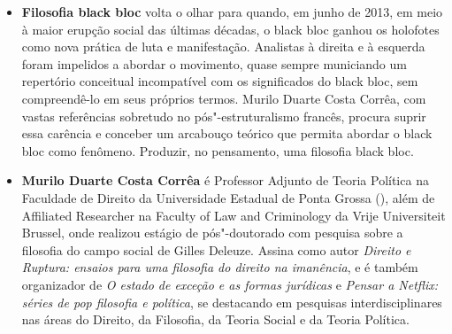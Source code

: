 \begin{itemize}
\item \textbf{Filosofia black bloc} volta o olhar para quando, em junho de
2013, em meio à maior erupção social das últimas décadas, o black
bloc ganhou os holofotes como nova prática de luta e manifestação. Analistas
à direita e à esquerda foram impelidos a abordar o movimento,
quase sempre municiando um repertório conceitual incompatível com os
significados do black bloc, sem compreendê-lo em seus próprios termos.
Murilo Duarte Costa Corrêa, com vastas referências sobretudo no pós"-estruturalismo
francês, procura suprir essa carência e conceber um arcabouço
teórico que permita abordar o black bloc como fenômeno. Produzir, no
pensamento, uma filosofia black bloc.


\item \textbf{Murilo Duarte Costa Corrêa} é Professor Adjunto de Teoria
Política na Faculdade de Direito da Universidade Estadual de Ponta Grossa
(), além de Affiliated Researcher na Faculty of Law and Criminology
da Vrije Universiteit Brussel, onde realizou estágio de pós"-doutorado com
pesquisa sobre a filosofia do campo social de Gilles Deleuze. Assina como autor
\emph{Direito e Ruptura: ensaios para uma filosofia do direito na
imanência}, e é também organizador de \emph{O estado de exceção e as formas jurídicas}
e \emph{Pensar a Netflix: séries de pop filosofia e política}, se destacando
em pesquisas interdisciplinares nas áreas do Direito, da Filosofia, da Teoria
Social e da Teoria Política.
\end{itemize}


